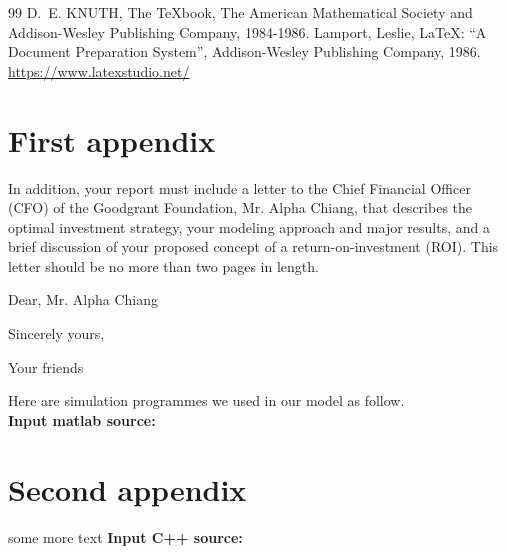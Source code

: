 \documentclass{mcmthesis}
\begin{document}
	\cleardoublepage 
	\begin{thebibliography}{99}
		 D.~E. KNUTH, The \TeX{}book, The American Mathematical Society and Addison-Wesley Publishing Company, 1984-1986.
		 Lamport, Leslie, \LaTeX{}: ``A Document Preparation System'', Addison-Wesley Publishing Company, 1986.
		 \url{https://www.latexstudio.net/}
	\end{thebibliography}
	\begin{appendices}
		
		\section{First appendix}
		
		In addition, your report must include a letter to the Chief Financial Officer (CFO) of the Goodgrant Foundation, Mr. Alpha Chiang, that describes the optimal investment strategy, your modeling approach and major results, and a brief discussion of your proposed concept of a return-on-investment (ROI). This letter should be no more than two pages in length.
		
		\begin{letter}{Dear, Mr. Alpha Chiang}
			
			\lipsum[1-2]
			
			\vspace{\parskip}
			
			Sincerely yours,
			
			Your friends
			
		\end{letter}
		Here are simulation programmes we used in our model as follow.\\
		
		\textbf{\textcolor[rgb]{0.98,0.00,0.00}{Input matlab source:}}
		
		\section{Second appendix}
		
		some more text \textcolor[rgb]{0.98,0.00,0.00}{\textbf{Input C++ source:}}
		
	\end{appendices}
	\AImatter
\end{document}
